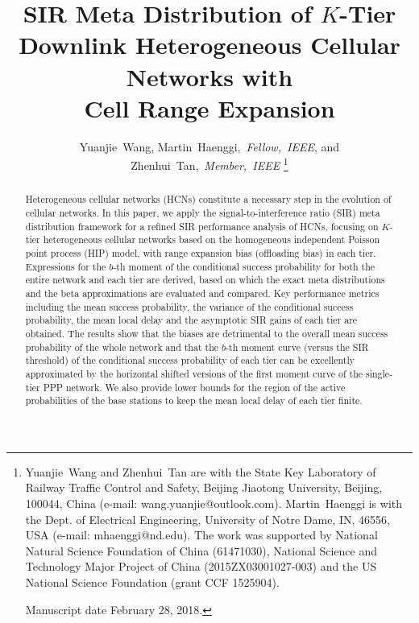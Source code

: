 \documentclass[12pt,draftclsnofoot,journal,onecolumn]{IEEEtran}
\begin{document}
%
\title{SIR Meta Distribution of $K$-Tier Downlink Heterogeneous Cellular Networks with\\ Cell Range Expansion}
\author{Yuanjie~Wang, 
		Martin~Haenggi,~\textit{Fellow,~IEEE},
		and Zhenhui~Tan,~\textit{Member,~IEEE}
		\thanks{Yuanjie~Wang and Zhenhui~Tan are with the State Key Laboratory of Railway Traffic Control and Safety, Beijing Jiaotong University, Beijing, 100044, China (e-mail: wang.yuanjie@outlook.com). Martin~Haenggi is with the Dept. of Electrical Engineering, University of Notre Dame, IN, 46556, USA (e-mail: mhaenggi@nd.edu). The work was supported by National Natural Science Foundation of China (61471030), National Science and Technology Major Project of China (2015ZX03001027-003) and the US National Science Foundation (grant CCF 1525904). 
			
		Manuscript date February 28, 2018.}
		}
	
\maketitle
\doublespacing

\begin{abstract}
Heterogeneous cellular networks (HCNs) constitute a necessary step in the evolution of cellular networks. In this paper, we apply the signal-to-interference ratio (SIR) meta distribution framework for a refined SIR performance analysis of HCNs, focusing on $K$-tier heterogeneous cellular networks based on the homogeneous independent Poisson point process (HIP) model, with range expansion bias (offloading bias) in each tier. Expressions for the $b$-th moment of the conditional success probability for both the entire network and each tier are derived, based on which the exact meta distributions and the beta approximations are evaluated and compared. Key performance metrics including the mean success probability, the variance of the conditional success probability, the mean local delay and the asymptotic SIR gains of each tier are obtained. The results show that the biases are detrimental to the overall mean success probability of the whole network and that the $b$-th moment curve (versus the SIR threshold) of the conditional success probability of each tier can be excellently approximated by the horizontal shifted versions of the first moment curve of the single-tier PPP network. We also provide lower bounds for the region of the active probabilities of the base stations to keep the mean local delay of each tier finite.   
\end{abstract}
\end{document}
